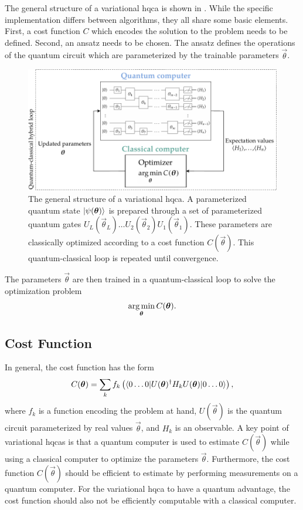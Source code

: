 The general structure of a variational \gls{hqca} is shown in .
While the specific implementation differs between algorithms, they all share some basic elements.
First, a cost function $C$ which encodes the solution to the problem needs to be defined.
Second, an ansatz needs to be chosen.
The ansatz defines the operations of the quantum circuit which are parameterized by the trainable parameters $\vec{\theta}$.
\begin{figure}[ht]
    \centering
    \includegraphics[width=1\linewidth]{figures/vqa-general-structure.pdf}
    \caption[The general structure of a variational \acrshort{hqca}.]{
        The general structure of a variational \gls{hqca}.
        A parameterized quantum state $\vert{\psi(\bm{\theta})}\rangle$ is prepared through a set of parameterized quantum gates $U_L(\vec{\theta}_L) \ldots U_2(\vec{\theta}_2)U_1(\vec{\theta}_1)$.
        These parameters are classically optimized according to a cost function $C(\vec{\theta})$.
        This quantum-classical loop is repeated until convergence.
    }
    \label{fig:vqa-general-structure}
\end{figure}
The parameters $\vec{\theta}$ are then trained in a quantum-classical loop to solve the optimization problem
\begin{equation} \label{eqn:optimization-problem}
\operatorname*{arg\,min}_{\bm{\theta}} C(\bm{\theta}).
\end{equation}

\subsection{Cost Function}
In general, the cost function has the form
\begin{equation} \label{eqn:general-cost-function}
C(\bm{\theta}) = \sum_k f_k\left(\langle{0\ldots 0}\vert U(\bm{\theta})^\dagger H_k U(\bm{\theta})\vert{0\ldots 0}\rangle\right),
\end{equation}
where $f_k$ is a function encoding the problem at hand, $U(\vec{\theta})$ is the quantum circuit parameterized by real values $\vec{\theta}$, and $H_k$ is an observable.
A key point of variational \glspl{hqca} is that a quantum computer is used to estimate $C(\vec{\theta})$ while using a classical computer to optimize the parameters $\vec{\theta}$.
Furthermore, the cost function $C(\vec{\theta})$ should be efficient to estimate by performing measurements on a quantum computer.
For the variational \gls{hqca} to have a quantum advantage, the cost function should also not be efficiently computable with a classical computer.

